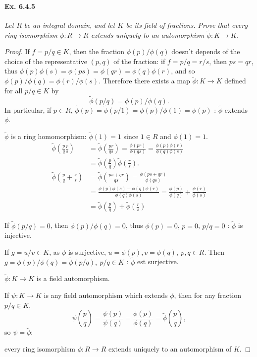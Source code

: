 \documentclass[11pt,a4paper]{article}
\begin{document}
\paragraph{Ex. 6.4.5}

{\it Let $R$ be an integral domain, and let $K$ be its field of fractions. Prove that every ring isomorphism $\phi : R \to R$ extends uniquely to an automorphism $\tilde{\phi} : K \to K$.
}

\begin{proof}

If $f = p/q \in K$, then the fraction $\phi(p)/\phi(q)$ doesn't depends of the choice of the representative $(p,q)$ of the fraction: if $f = p/q = r/s$, then $ps=qr$, thus $\phi(p)\phi(s) = \phi(ps) = \phi(qr) =\phi(q)\phi(r)$, and so $\phi(p)/\phi(q) = \phi(r)/\phi(s)$. Therefore there exists a map $\tilde{\phi} : K \to K$ defined for all $p/q\in  K$ by
$$\tilde{\phi}(p/q) = \phi(p)/\phi(q).$$
In particular, if $p\in R$, $\tilde{\phi}(p) = \tilde{\phi}(p/1) = \phi(p)/\phi(1) = \phi(p)$ : $\tilde{\phi}$ extends $\phi$.

$\tilde{\phi}$ is a ring homomorphism: $\tilde{\phi}(1) = 1$ since $1 \in R$ and $\phi(1)=1$.
\begin{align*}
\tilde{\phi}\left(\frac{p}{q} \frac{r}{s}\right) &= \tilde{\phi}\left(\frac{pr}{qs}\right) =\frac{ \phi(pr)}{\phi(qs)}
 =\frac{\phi(p) \phi(r)}{\phi(q)\phi(s)}\\
 & =\tilde{\phi}\left(\frac{p}{q}\right) \tilde{\phi}\left(\frac{r}{s}\right).\\
\tilde{\phi}\left(\frac{p}{q} +\frac{r}{s}\right) &=  \tilde{\phi}\left(\frac{ps+qr}{qs}\right)= \frac{ \phi(ps+qr)}{\phi(qs)}\\
&=\frac{\phi(p)\phi(s)+\phi(q) \phi(r)}{\phi(q)\phi(s)} = \frac{\phi(p)}{\phi(q)}+ \frac{\phi(r)}{\phi(s)} \\
&= \tilde{\phi}\left(\frac{p}{q}\right) + \tilde{\phi}\left(\frac{r}{s}\right) 
\end{align*}

If $\tilde{\phi}(p/q) =0$, then $\phi(p)/\phi(q) =0$, thus $\phi(p) = 0$, $p=0$, $p/q = 0$ : $\tilde{\phi}$ is injective.

If $g = u/v \in K$, as $\phi$ is surjective, $u = \phi(p),v=\phi(q),\  p,q\in R$. Then $g = \phi(p)/\phi(q) = \tilde{\phi}(p/q),\  p/q \in K$ : $\tilde{\phi}$ est surjective.

$\tilde{\phi} : K \to K$ is a field automorphism.

If $\psi : K \to K$ is any field automorphism which extends $\phi$, then for any fraction $p/q \in K$,
$$\psi \left(\frac{p}{q} \right) = \frac{\psi(p)}{\psi(q)} = \frac{\phi(p)}{\phi(q)} = \tilde{\phi}\left(\frac{p}{q}\right),$$
so $\psi = \tilde{\phi}$:

every ring isomorphism $\phi : R \to R$ extends uniquely to an automorphism of $K$.
\end{proof}
\end{document}
